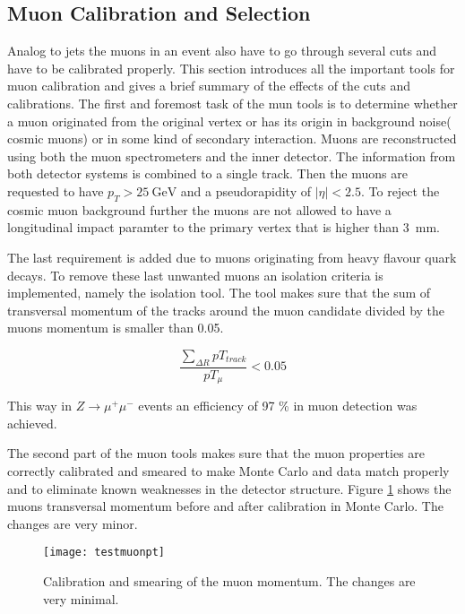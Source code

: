 \subsection{Muon Calibration and Selection}

Analog to jets the muons in an event also have to go through several cuts and have to be calibrated properly. This section introduces all the important tools for muon calibration and gives a brief summary of the effects of the cuts and calibrations.
The first and foremost task of the mun tools is to determine whether a muon originated from the original vertex or has its origin in background noise( cosmic muons) or in some kind of secondary interaction. Muons are reconstructed using both the muon spectrometers and the inner detector. The information from both detector systems is combined to a single track. Then the muons are requested to have $p_T > \SI{25}{\GeV}$ and a pseudorapidity of $|\eta| < \num{2.5}$. To reject the cosmic muon background further the muons are not allowed to have a longitudinal impact paramter to the primary vertex that is higher than \SI{3}{\mm}. 

The last requirement is added due to muons originating from heavy flavour quark decays.
To remove these last unwanted muons an isolation criteria is implemented, namely the isolation tool. The tool makes sure that the sum of transversal momentum of the tracks around the muon candidate divided by the muons momentum is smaller than \num{0.05}. 

\begin{equation}
\frac{\sum_{\Delta R}pT_{track}}{pT_{\mu}} < 0.05
\end{equation}

This way in $Z \rightarrow \mu^+ \mu^-$ events an efficiency of \num{97} \% in muon detection was achieved.

The second part of the muon tools makes sure that the muon properties are correctly calibrated and smeared to make Monte Carlo and data match properly and to eliminate known weaknesses in the detector structure. Figure \ref{fig:testmuonpt} shows the muons transversal momentum before and after calibration in Monte Carlo. The changes are very minor.

\begin{figure}[h]
\centering
\texttt{[image: testmuonpt]}
\caption{Calibration and smearing of the muon momentum. The changes are very minimal.}
\label{fig:testmuonpt}
\end{figure}

